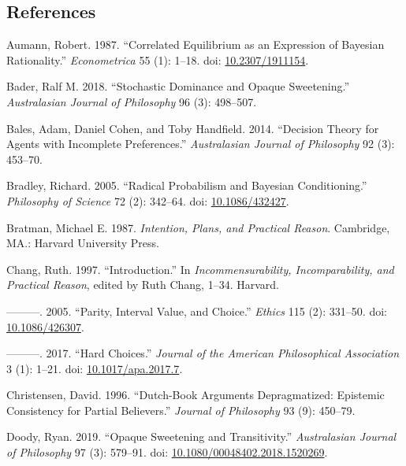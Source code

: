 \documentclass[
  11pt,
  letterpaper,
  DIV=11,
  numbers=noendperiod,
  twoside]{scrartcl}
\newlength{\cslhangindent}
\newenvironment{CSLReferences}[2] %
 {\begin{list}{}{%
  \setlength{\itemindent}{0pt}
  \setlength{\leftmargin}{0pt}
  \setlength{\parsep}{0pt}
  \ifodd #1
   \setlength{\leftmargin}{\cslhangindent}
   \setlength{\itemindent}{-1\cslhangindent}
  \fi
  \setlength{\itemsep}{#2\baselineskip}}}
 {\end{list}}
\begin{document}
\subsection*{References}\label{references}

\label{refs}
\begin{CSLReferences}{1}{0}
Aumann, Robert. 1987. {``Correlated Equilibrium as an Expression of
Bayesian Rationality.''} \emph{Econometrica} 55 (1): 1--18. doi:
\href{https://doi.org/10.2307/1911154}{10.2307/1911154}.

Bader, Ralf M. 2018. {``Stochastic Dominance and Opaque Sweetening.''}
\emph{Australasian Journal of Philosophy} 96 (3): 498--507.

Bales, Adam, Daniel Cohen, and Toby Handfield. 2014. {``Decision Theory
for Agents with Incomplete Preferences.''} \emph{Australasian Journal of
Philosophy} 92 (3): 453--70.

Bradley, Richard. 2005. {``Radical Probabilism and Bayesian
Conditioning.''} \emph{Philosophy of Science} 72 (2): 342--64. doi:
\href{https://doi.org/10.1086/432427}{10.1086/432427}.

Bratman, Michael E. 1987. \emph{Intention, Plans, and Practical Reason}.
Cambridge, MA.: Harvard University Press.

Chang, Ruth. 1997. {``Introduction.''} In \emph{Incommensurability,
Incomparability, and Practical Reason}, edited by Ruth Chang, 1--34.
Harvard.

---------. 2005. {``Parity, Interval Value, and Choice.''} \emph{Ethics}
115 (2): 331--50. doi:
\href{https://doi.org/10.1086/426307}{10.1086/426307}.

---------. 2017. {``Hard Choices.''} \emph{Journal of the American
Philosophical Association} 3 (1): 1--21. doi:
\href{https://doi.org/10.1017/apa.2017.7}{10.1017/apa.2017.7}.

Christensen, David. 1996. {``Dutch-Book Arguments Depragmatized:
Epistemic Consistency for Partial Believers.''} \emph{Journal of
Philosophy} 93 (9): 450--79.

Doody, Ryan. 2019. {``Opaque Sweetening and Transitivity.''}
\emph{Australasian Journal of Philosophy} 97 (3): 579--91. doi:
\href{https://doi.org/10.1080/00048402.2018.1520269}{10.1080/00048402.2018.1520269}.


\end{CSLReferences}
\end{document}
